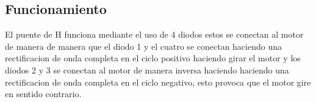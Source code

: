 \documentclass[12pt,a4paper]{report}
\begin{document}
\subsection{Funcionamiento}
El puente de H funciona mediante el uso de 4 diodos estos se conectan al motor de manera de manera que el diodo 1 y el cuatro se conectan haciendo una rectificacion de onda completa en el ciclo positivo haciendo girar el motor y los diodos 2 y 3 se conectan al motor de manera inversa haciendo haciendo una rectificacion de onda completa en el ciclo negativo, esto provoca que el motor gire en sentido contrario.


\cite{PUENTEH}


\end{document}
